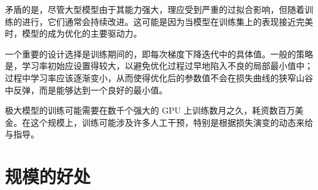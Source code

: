 矛盾的是，尽管大型模型由于其能力强大，理应受到严重的过拟合影响，但随着训练的进行，它们通常会持续改进。这可能是因为当模型在训练集上的表现接近完美时，模型的成为优化的主要驱动力\citep{arxiv-1812.11118}。

一个重要的设计选择是训练期间的，即每次梯度下降迭代中的具体值。一般的策略是，学习率初始应设置得较大，以避免优化过程过早地陷入不良的局部最小值中；过程中学习率应该逐渐变小，从而使得优化后的参数值不会在损失曲线的狭窄山谷中反弹，而是能够达到一个良好的最小值。

极大模型的训练可能需要在数千个强大的 GPU 上训练数月之久，耗资数百万美金。在这个规模上，训练可能涉及许多人工干预，特别是根据损失演变的动态来给与指导。

\section{规模的好处}